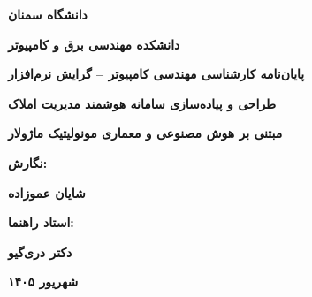 \documentclass[11pt, a4paper]{report}
\makeatletter
\let\amlak@tabular\tabular
\let\amlak@iitabular\@tabular
\let\amlak@endtabular\endtabular
\let\amlak@array\@array
\let\amlak@endarray\endarray
\let\tabular\amlak@tabular
\let\@tabular\amlak@iitabular
\let\endtabular\amlak@endtabular
\let\@array\amlak@array
\let\endarray\amlak@endarray
\makeatother
\begin{document}
\makeatletter
\let\tabular\amlak@tabular
\let\@tabular\amlak@iitabular
\let\endtabular\amlak@endtabular
\let\@array\amlak@array
\let\endarray\amlak@endarray
\makeatother


\begin{titlepage}
    \centering
    \vspace*{0.5cm}

    \begin{figure}[h]
      \centering
    \end{figure}
    \vspace{0.3cm}
    {\LARGE \bfseries دانشگاه سمنان \par}
    \vspace{0.5cm}
    {\large \bfseries دانشکده مهندسی برق و کامپیوتر \par}
    \vspace{1.5cm}
    {\normalsize \bfseries پایان‌نامه کارشناسی مهندسی کامپیوتر -- گرایش نرم‌افزار \par}
    \vspace{1.8cm}
    {\huge \bfseries طراحی و پیاده‌سازی سامانه هوشمند مدیریت املاک \par}
    \vspace{0.4cm}
    {\large \bfseries مبتنی بر هوش مصنوعی و معماری مونولیتیک ماژولار \par}
    \vspace{2.2cm}
    {\normalsize \bfseries نگارش: \par}
    {\Large \bfseries شایان عموزاده \par}
    \vspace{1.5cm}
    {\normalsize \bfseries استاد راهنما: \par}
    {\Large \bfseries دکتر دری‌گیو \par}
    \vfill
    {\normalsize \bfseries شهریور ۱۴۰۵ \par}
\end{titlepage}
\end{document}
